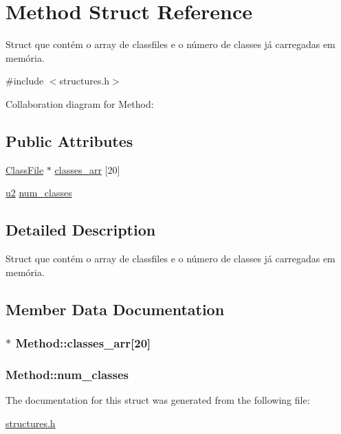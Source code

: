\hypertarget{structMethod}{}\section{Method Struct Reference}
\label{structMethod}


Struct que contém o array de classfiles e o número de classes já carregadas em memória.  




{\ttfamily \#include $<$structures.\+h$>$}



Collaboration diagram for Method\+:
\subsection*{Public Attributes}
\begin{DoxyCompactItemize}
\item 
\hyperlink{structClassFile}{Class\+File} $\ast$ \hyperlink{structMethod_ace741cd234df7db5849ee2af75870b8c}{classes\+\_\+arr} \mbox{[}20\mbox{]}
\item 
\hyperlink{structures_8h_a55ef8d87fd202b8417704c089899c5b9}{u2} \hyperlink{structMethod_a40dccf4ca5a8d3a74798917a888be720}{num\+\_\+classes}
\end{DoxyCompactItemize}


\subsection{Detailed Description}
Struct que contém o array de classfiles e o número de classes já carregadas em memória. 

\subsection{Member Data Documentation}
\subsubsection[{\texorpdfstring{classes\+\_\+arr}{classes_arr}}]{$\ast$ Method\+::classes\+\_\+arr\mbox{[}20\mbox{]}}\hypertarget{structMethod_ace741cd234df7db5849ee2af75870b8c}{}\label{structMethod_ace741cd234df7db5849ee2af75870b8c}
\subsubsection[{\texorpdfstring{num\+\_\+classes}{num_classes}}]{ Method\+::num\+\_\+classes}\hypertarget{structMethod_a40dccf4ca5a8d3a74798917a888be720}{}\label{structMethod_a40dccf4ca5a8d3a74798917a888be720}


The documentation for this struct was generated from the following file\+:\begin{DoxyCompactItemize}
\item 
\hyperlink{structures_8h}{structures.\+h}\end{DoxyCompactItemize}
